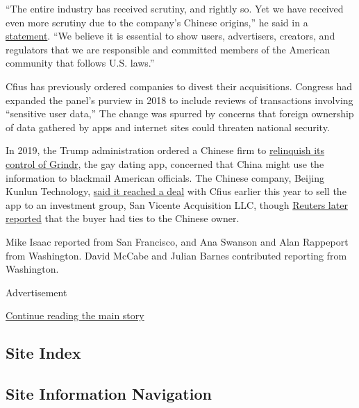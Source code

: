 ``The entire industry has received scrutiny, and rightly so. Yet we have
received even more scrutiny due to the company's Chinese origins,'' he
said in a
\href{https://newsroom.tiktok.com/en-us/fair-competition-and-transparency-benefits-us-all}{statement}.
``We believe it is essential to show users, advertisers, creators, and
regulators that we are responsible and committed members of the American
community that follows U.S. laws.''

Cfius has previously ordered companies to divest their acquisitions.
Congress had expanded the panel's purview in 2018 to include reviews of
transactions involving ``sensitive user data,'' The change was spurred
by concerns that foreign ownership of data gathered by apps and internet
sites could threaten national security.

In 2019, the Trump administration ordered a Chinese firm to
\href{https://www.nytimes.com/2019/03/28/us/politics/grindr-china-national-security.html}{relinquish
its control of Grindr}, the gay dating app, concerned that China might
use the information to blackmail American officials. The Chinese
company, Beijing Kunlun Technology,
\href{https://www.reuters.com/article/us-grindr-m-a-investors-exclusive/exclusive-grindrs-chinese-owner-nears-deal-to-sell-gay-dating-app-sources-idUSKBN20T0IR}{said
it reached a deal} with Cfius earlier this year to sell the app to an
investment group, San Vicente Acquisition LLC, though
\href{https://www.reuters.com/article/us-grindr-m-a-sanvicente-exclusive/exclusive-winning-bidder-for-grindr-has-ties-to-chinese-owner-idUSKBN2391AI}{Reuters
later reported} that the buyer had ties to the Chinese owner.

Mike Isaac reported from San Francisco, and Ana Swanson and Alan
Rappeport from Washington. David McCabe and Julian Barnes contributed
reporting from Washington.

Advertisement

\protect\hyperlink{after-bottom}{Continue reading the main story}

\hypertarget{site-index}{%
\subsection{Site Index}\label{site-index}}

\hypertarget{site-information-navigation}{%
\subsection{Site Information
Navigation}\label{site-information-navigation}}

